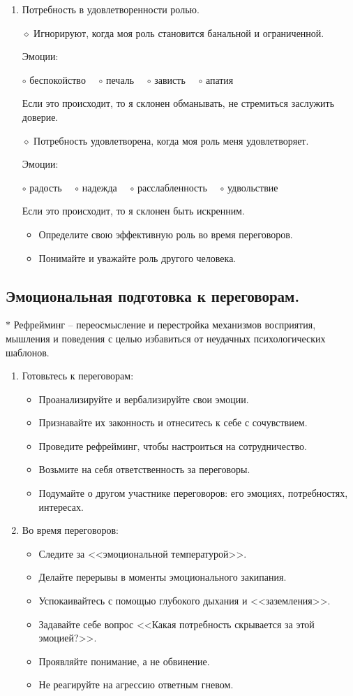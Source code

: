 \documentclass[12pt,a4paper]{report}
\begin{document}
\begin{enumerate}
	\smallskip
	\item Потребность в удовлетворенности ролью.
	
	\medskip
	$\diamond$ Игнорируют, когда моя роль становится банальной и ограниченной.
	
	Эмоции:
	
	$\circ$ беспокойство~~
	$\circ$ печаль~~
	$\circ$ зависть~~
	$\circ$ апатия~~
	
	Если это происходит, то я склонен обманывать, не стремиться заслужить доверие.
	
	\bigskip
	$\diamond$ Потребность удовлетворена, когда моя роль меня удовлетворяет.
	
	Эмоции:
	
	$\circ$ радость~~
	$\circ$ надежда~~
	$\circ$ расслабленность~~
	$\circ$ удвольствие~~
	
	Если это происходит, то я склонен быть искренним.
	
	\smallskip
	\begin{itemize}
		\item Определите свою эффективную роль во время переговоров.
		\item Понимайте и уважайте роль другого человека.
	\end{itemize}
\end{enumerate}

\subsection*{Эмоциональная подготовка к переговорам.}
$\ast$ Рефрейминг -- переосмысление и перестройка механизмов восприятия, мышления и поведения с целью избавиться от неудачных психологических шаблонов.
\begin{enumerate}
	\item Готовьтесь к переговорам:
	\begin{itemize}
		\item Проанализируйте и вербализируйте свои эмоции.
		\item Признавайте их законность и отнеситесь к себе с сочувствием.
		\item Проведите рефрейминг, чтобы настроиться на сотрудничество.
		\item Возьмите на себя ответственность за переговоры.
		\item Подумайте о другом участнике переговоров: его эмоциях, потребностях, интересах.
	\end{itemize}
	\item Во время переговоров:
	\begin{itemize}
		\item Следите за <<эмоциональной температурой>>.
		\item Делайте перерывы в моменты эмоционального закипания.
		\item Успокаивайтесь с помощью глубокого дыхания и <<заземления>>.
		\item Задавайте себе вопрос <<Какая потребность скрывается за этой эмоцией?>>.
		\item Проявляйте понимание, а не обвинение.
		\item Не реагируйте на агрессию ответным гневом.
	\end{itemize}
\end{enumerate}
\end{document}
